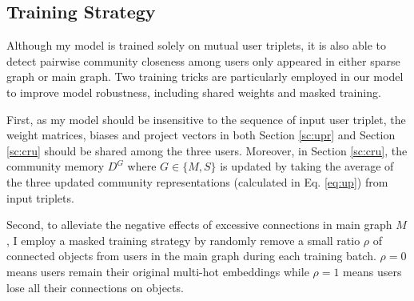 \subsection{Training Strategy}\label{sc:mt}

Although my model is trained solely on mutual user triplets, it is also able to detect pairwise community closeness among users only appeared in either sparse graph or main graph. Two training tricks are particularly employed in our model to improve model robustness, including shared weights and masked training. 

First, as my model should be insensitive to the sequence of input user triplet, the weight matrices, biases and project vectors in both Section \ref{sc:upr} and Section \ref{sc:cru} should be shared among the three users. Moreover, in  Section \ref{sc:cru}, the community memory $D^G$ where $G \in \{M,S\}$ is updated by taking the average of the three updated community representations (calculated in Eq. \ref{eq:up}) from input triplets.

Second, to alleviate the negative effects of excessive connections in main graph $M$, I employ a masked training strategy by randomly remove a small ratio $\rho$ of connected objects from users in the main graph during each training batch. $\rho = 0$ means users remain their original multi-hot embeddings while $\rho = 1$ means users lose all their connections on objects. 




